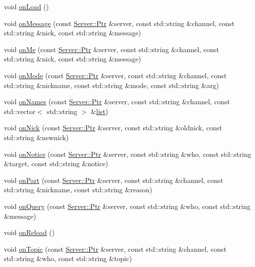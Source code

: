 \begin{DoxyCompactItemize}
void \hyperlink{a00051_a416a5d7df4ab4025ffa032ff1f93533b}{on\-Load} ()
\item 
void \hyperlink{a00051_aca329c5cd97c99552c0e0365dc5ddaeb}{on\-Message} (const \hyperlink{a00055_aea3f9694df81348b909814ac6f84f874}{Server\-::\-Ptr} \&server, const std\-::string \&channel, const std\-::string \&nick, const std\-::string \&message)
\item 
void \hyperlink{a00051_a55e3f97e30022ba2902a4b1fad5a9aea}{on\-Me} (const \hyperlink{a00055_aea3f9694df81348b909814ac6f84f874}{Server\-::\-Ptr} \&server, const std\-::string \&channel, const std\-::string \&nick, const std\-::string \&message)
\item 
void \hyperlink{a00051_ade2ff1747d2c8e20a52abfe89835a91d}{on\-Mode} (const \hyperlink{a00055_aea3f9694df81348b909814ac6f84f874}{Server\-::\-Ptr} \&server, const std\-::string \&channel, const std\-::string \&nickname, const std\-::string \&mode, const std\-::string \&arg)
\item 
void \hyperlink{a00051_af54e5d1d1931114e42ba161e5fe82c52}{on\-Names} (const \hyperlink{a00055_aea3f9694df81348b909814ac6f84f874}{Server\-::\-Ptr} \&server, const std\-::string \&channel, const std\-::vector$<$ std\-::string $>$ \&\hyperlink{a00051_acbb4d3f2e6d76890f6bcbf644b5f1352}{list})
\item 
void \hyperlink{a00051_a6cb3ee1bb391a4224280e6314e6652d4}{on\-Nick} (const \hyperlink{a00055_aea3f9694df81348b909814ac6f84f874}{Server\-::\-Ptr} \&server, const std\-::string \&oldnick, const std\-::string \&newnick)
\item 
void \hyperlink{a00051_a9f3fb0bd132b6a3b3c21b9ff67482b92}{on\-Notice} (const \hyperlink{a00055_aea3f9694df81348b909814ac6f84f874}{Server\-::\-Ptr} \&server, const std\-::string \&who, const std\-::string \&target, const std\-::string \&notice)
\item 
void \hyperlink{a00051_a678596d1f80cd48e56761b22d6c9bb92}{on\-Part} (const \hyperlink{a00055_aea3f9694df81348b909814ac6f84f874}{Server\-::\-Ptr} \&server, const std\-::string \&channel, const std\-::string \&nickname, const std\-::string \&reason)
\item 
void \hyperlink{a00051_af709301b875f50c94083931ab60abd88}{on\-Query} (const \hyperlink{a00055_aea3f9694df81348b909814ac6f84f874}{Server\-::\-Ptr} \&server, const std\-::string \&who, const std\-::string \&message)
\item 
void \hyperlink{a00051_ae3a5c6dfa314b952521910201a683fcd}{on\-Reload} ()
\item 
void \hyperlink{a00051_a4fb62637b0678c805ae72d263553ddee}{on\-Topic} (const \hyperlink{a00055_aea3f9694df81348b909814ac6f84f874}{Server\-::\-Ptr} \&server, const std\-::string \&channel, const std\-::string \&who, const std\-::string \&topic)

\end{DoxyCompactItemize}
